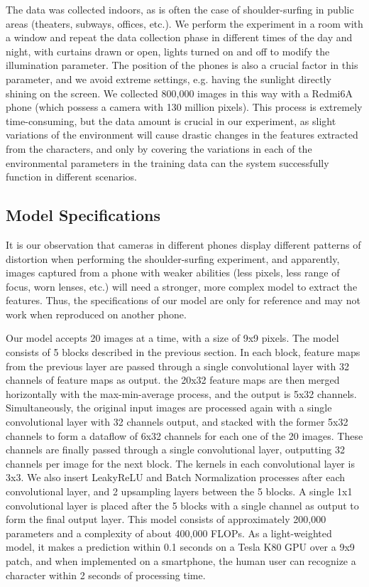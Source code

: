 The data was collected indoors, as is often the case of shoulder-surfing in public areas (theaters, subways, offices, etc.). We perform the experiment in a room with a window and repeat the data collection phase in different times of the day and night, with curtains drawn or open, lights turned on and off to modify the illumination parameter. The position of the phones is also a crucial factor in this parameter, and we avoid extreme settings, e.g. having the sunlight directly shining on the screen. We collected 800,000 images in this way with a Redmi6A phone (which possess a camera with 130 million pixels). This process is extremely time-consuming, but the data amount is crucial in our experiment, as slight variations of the environment will cause drastic changes in the features extracted from the characters, and only by covering the variations in each of the environmental parameters in the training data can the system successfully function in different scenarios.

\subsection{Model Specifications}
It is our observation that cameras in different phones display different patterns of distortion when performing the shoulder-surfing experiment, and apparently, images captured from a phone with weaker abilities (less pixels, less range of focus, worn lenses, etc.) will need a stronger, more complex model to extract the features. Thus, the specifications of our model are only for reference and may not work when reproduced on another phone.

Our model accepts 20 images at a time, with a size of 9x9 pixels. The model consists of 5 blocks described in the previous section. In each block, feature maps from the previous layer are passed through a single convolutional layer with 32 channels of feature maps as output. the 20x32 feature maps are then merged horizontally with the max-min-average process, and the output is 5x32 channels. Simultaneously, the original input images are processed again with a single convolutional layer with 32 channels output, and stacked with the former 5x32 channels to form a dataflow of 6x32 channels for each one of the 20 images. These channels are finally passed through a single convolutional layer, outputting 32 channels per image for the next block. The kernels in each convolutional layer is 3x3. We also insert LeakyReLU and Batch Normalization processes after each convolutional layer, and 2 upsampling layers between the 5 blocks. A single 1x1 convolutional layer is placed after the 5 blocks with a single channel as output to form the final output layer. This model consists of approximately 200,000 parameters and a complexity of about 400,000 FLOPs. As a light-weighted model, it makes a prediction within 0.1 seconds on a Tesla K80 GPU over a 9x9 patch, and when implemented on a smartphone, the human user can recognize a character within 2 seconds of processing time.

